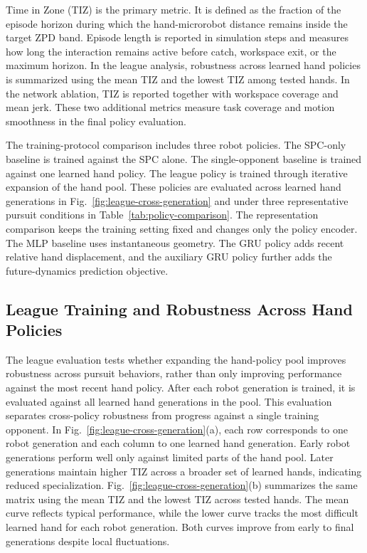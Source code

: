 \documentclass[lettersize,journal]{IEEEtran}
\begin{document}
Time in Zone (TIZ) is the primary metric. It is defined as the fraction of the episode horizon during which the hand-microrobot distance remains inside the target ZPD band. Episode length is reported in simulation steps and measures how long the interaction remains active before catch, workspace exit, or the maximum horizon. In the league analysis, robustness across learned hand policies is summarized using the mean TIZ and the lowest TIZ among tested hands. In the network ablation, TIZ is reported together with workspace coverage and mean jerk. These two additional metrics measure task coverage and motion smoothness in the final policy evaluation.

The training-protocol comparison includes three robot policies. The SPC-only baseline is trained against the SPC alone. The single-opponent baseline is trained against one learned hand policy. The league policy is trained through iterative expansion of the hand pool. These policies are evaluated across learned hand generations in Fig.~\ref{fig:league-cross-generation} and under three representative pursuit conditions in Table~\ref{tab:policy-comparison}. The representation comparison keeps the training setting fixed and changes only the policy encoder. The MLP baseline uses instantaneous geometry. The GRU policy adds recent relative hand displacement, and the auxiliary GRU policy further adds the future-dynamics prediction objective.

\subsection{League Training and Robustness Across Hand Policies}
\label{subsec:league-robustness}
The league evaluation tests whether expanding the hand-policy pool improves robustness across pursuit behaviors, rather than only improving performance against the most recent hand policy. After each robot generation is trained, it is evaluated against all learned hand generations in the pool. This evaluation separates cross-policy robustness from progress against a single training opponent. In Fig.~\ref{fig:league-cross-generation}(a), each row corresponds to one robot generation and each column to one learned hand generation. Early robot generations perform well only against limited parts of the hand pool. Later generations maintain higher TIZ across a broader set of learned hands, indicating reduced specialization. Fig.~\ref{fig:league-cross-generation}(b) summarizes the same matrix using the mean TIZ and the lowest TIZ across tested hands. The mean curve reflects typical performance, while the lower curve tracks the most difficult learned hand for each robot generation. Both curves improve from early to final generations despite local fluctuations.
\end{document}
